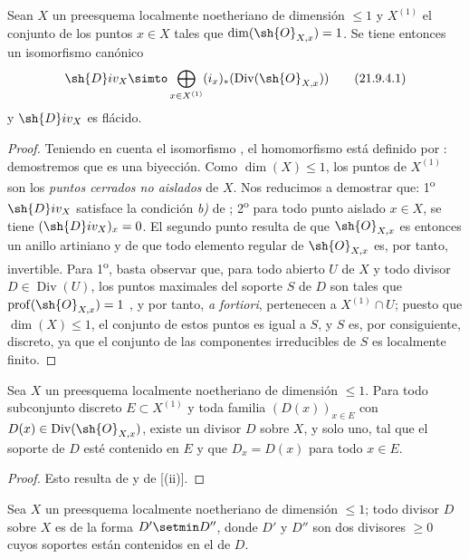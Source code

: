 \begin{proposition}[21.9.4]
\label{IV.21.9.4}
Sean $X$ un preesquema localmente noetheriano de dimensión $\leq1$ y $X^{(1)}$ el conjunto de los puntos $x\in X$ tales que $\dim(\sh{O}_{X,x})=1$.
Se tiene entonces un isomorfismo canónico
\[
\label{IV.21.9.4.1}
  \sh{D}iv_X\simto\bigoplus_{x\in X^{(1)}}(i_x)_*(\operatorname{Div}(\sh{O}_{X,x}))
  \tag{21.9.4.1}
\]
y $\sh{D}iv_X$ es flácido.
\end{proposition}

\begin{proof}
Teniendo en cuenta el isomorfismo , el homomorfismo  está definido por :
demostremos que es una biyección.
Como $\dim(X)\leq1$, los puntos de $X^{(1)}$ son los \emph{puntos cerrados no aislados} de $X$.
Nos reducimos a demostrar que:
1\textsuperscript{o} $\sh{D}iv_X$ satisface la condición \emph{b)} de ;
2\textsuperscript{o} para todo punto aislado $x\in X$, se tiene $(\sh{D}iv_X)_x=0$.
El segundo punto resulta de que $\sh{O}_{X,x}$ es entonces un anillo artiniano y de que todo elemento regular de $\sh{O}_{X,x}$ es, por tanto, invertible.
Para 1\textsuperscript{o}, basta observar que, para todo abierto $U$ de $X$ y todo divisor $D\in\operatorname{Div}(U)$, los puntos maximales del soporte $S$ de $D$ son tales que $\operatorname{prof}(\sh{O}_{X,x})=1$ , y por tanto, \emph{a fortiori}, pertenecen a $X^{(1)}\cap U$;
puesto que $\dim(X)\leq1$, el conjunto de estos puntos es igual a $S$, y $S$ es, por consiguiente, discreto, ya que el conjunto de las componentes irreducibles de $S$ es localmente finito.
\end{proof}

\begin{corollary}[21.9.5]
\label{IV.21.9.5}
Sea $X$ un preesquema localmente noetheriano de dimensión $\leq1$.
Para todo subconjunto discreto $E\subset X^{(1)}$ y toda familia $(D(x))_{x\in E}$ con $D(x)\in\operatorname{Div}(\sh{O}_{X,x})$, existe un divisor $D$ sobre $X$, y solo uno, tal que el soporte de $D$ esté contenido en $E$ y que $D_x=D(x)$ para todo $x\in E$.
\end{corollary}

\begin{proof}
Esto resulta de  y de [(ii)].
\end{proof}

\begin{corollary}[21.9.6]
\label{IV.21.9.6}
Sea $X$ un preesquema localmente noetheriano de dimensión $\leq1$;
todo divisor $D$ sobre $X$ es de la forma $D'\setmin D''$, donde $D'$ y $D''$ son dos divisores $\geq0$ cuyos soportes están contenidos en el de $D$.
\end{corollary}

